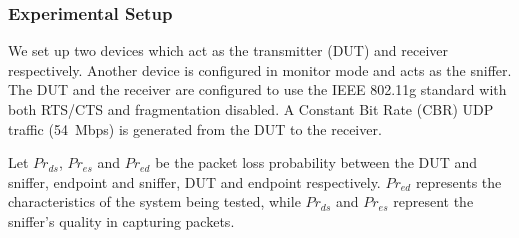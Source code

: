\subsubsection{Experimental Setup}

We set up two \wifi{} devices which act as the transmitter (DUT) and receiver
respectively.  Another \wifi{} device is configured in monitor mode and acts as
the sniffer.  The DUT and the receiver are configured to use the IEEE 802.11g
standard with both RTS/CTS and fragmentation disabled.  A Constant Bit Rate
(CBR) UDP traffic (54~Mbps) is generated from the DUT to the receiver.


Let $Pr_{ds}$, $Pr_{es}$ and $Pr_{ed}$ be the packet loss probability between
the DUT and sniffer, endpoint and sniffer, DUT and endpoint respectively.
$Pr_{ed}$ represents the characteristics of the system being tested, while
$Pr_{ds}$ and $Pr_{es}$ represent the sniffer's quality in capturing packets.

